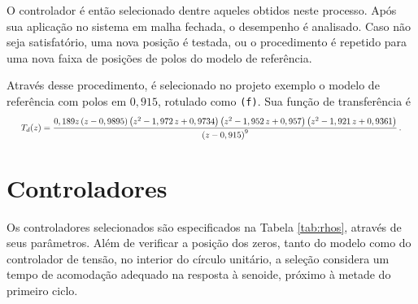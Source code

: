 \documentclass[repeatfields,oneside,overleaf]{tcc}
\newcommand{\mycdot}{ \, }
\begin{document}
O controlador é então selecionado dentre aqueles obtidos neste processo.
Após sua aplicação no sistema em malha fechada, o desempenho é analisado.
Caso não seja satisfatório, uma nova posição é testada, ou o procedimento é repetido para uma nova faixa de posições de polos do modelo de referência.

Através desse procedimento, é selecionado no projeto exemplo o modelo de referência com polos em $0,915$, rotulado como \texttt{(f)}.
Sua função de transferência é
\begin{equation}
    \resizebox{.97\textwidth}{!}{$%
    T_d(z) = \dfrac{  0,189  z \left(z-0,9895\right) \left(z^2 - 1,972 \mycdot z + 0,9734\right) \left(z^2 - 1,952 \mycdot z + 0,957\right) \left(z^2 - 1,921 \mycdot z + 0,9361\right) }
                   { \left( z - 0,915 \right)^9 }
    \,.
    $}%
\end{equation}

\section{Controladores}

Os controladores selecionados são especificados na Tabela \ref{tab:rhos}, através de seus parâmetros.
Além de verificar a posição dos zeros, tanto do modelo como do controlador de tensão, no interior do círculo unitário, a seleção considera um tempo de acomodação adequado na resposta à senoide, próximo à metade do primeiro ciclo.
\end{document}
